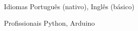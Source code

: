 
\begin{cvskills}
	\cvskill
	{Idiomas}
	{Português (nativo), Inglês (básico)}

	\cvskill
	{Profissionais}
	{Python, Arduino}

\end{cvskills}
